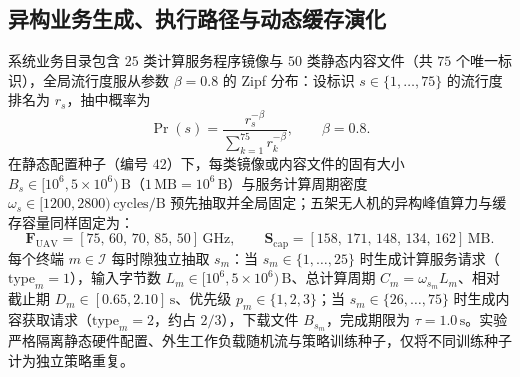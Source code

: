 \subsection{异构业务生成、执行路径与动态缓存演化}
\label{sec:request-battery-model}
\label{sec:ch3-service-paths}
\label{sec:ch3-cache-dynamics}

系统业务目录包含 $25$ 类计算服务程序镜像与 $50$ 类静态内容文件（共 $75$ 个唯一标识），全局流行度服从参数 $\beta=0.8$ 的 Zipf 分布\cite{zipf1949human}：设标识 $s\in\{1,\ldots,75\}$ 的流行度排名为 $r_s$，抽中概率为
\begin{equation}
 \Pr(s)=\frac{r_s^{-\beta}}{\sum_{k=1}^{75}r_k^{-\beta}},
 \qquad\beta=0.8.
 \label{eq:ch3-zipf}
\end{equation}
在静态配置种子（编号 $42$）下，每类镜像或内容文件的固有大小 $B_s\in[10^6,5\times 10^6)\,\mathrm{B}$（$1\,\mathrm{MB}=10^6\,\mathrm{B}$）与服务计算周期密度 $\omega_s\in[1200,2800)\,\mathrm{cycles/B}$ 预先抽取并全局固定；五架无人机的异构峰值算力与缓存容量同样固定为：
\begin{equation}
 \mathbf F_{\mathrm{UAV}}=[75,\,60,\,70,\,85,\,50]\,\mathrm{GHz},\qquad
 \mathbf S_{\mathrm{cap}}=[158,\,171,\,148,\,134,\,162]\,\mathrm{MB}.
 \label{eq:ch3-static-uav-specs}
\end{equation}
每个终端 $m\in\mathcal{I}$ 每时隙独立抽取 $s_m$：当 $s_m\in\{1,\ldots,25\}$ 时生成计算服务请求（$\mathrm{type}_m=1$），输入字节数 $L_m\in[10^6,5\times 10^6)\,\mathrm{B}$、总计算周期 $C_m=\omega_{s_m}L_m$、相对截止期 $D_m\in[0.65,2.10]\,\mathrm{s}$、优先级 $p_m\in\{1,2,3\}$；当 $s_m\in\{26,\ldots,75\}$ 时生成内容获取请求（$\mathrm{type}_m=2$，约占 $2/3$），下载文件 $B_{s_m}$，完成期限为 $\tau=1.0\,\mathrm{s}$。实验严格隔离静态硬件配置、外生工作负载随机流与策略训练种子，仅将不同训练种子计为独立策略重复。

